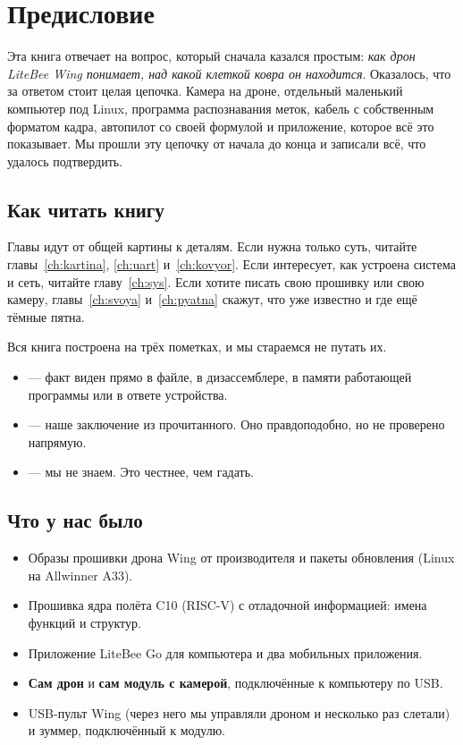 \chapter*{Предисловие}

Эта книга отвечает на вопрос, который сначала казался простым: \emph{как дрон LiteBee Wing понимает, над какой клеткой ковра он находится}. Оказалось, что за ответом стоит целая цепочка. Камера на дроне, отдельный маленький компьютер под Linux, программа распознавания меток, кабель с собственным форматом кадра, автопилот со своей формулой и приложение, которое всё это показывает. Мы прошли эту цепочку от начала до конца и записали всё, что удалось подтвердить.

\section*{Как читать книгу}

Главы идут от общей картины к деталям. Если нужна только суть, читайте главы~\ref{ch:kartina}, \ref{ch:uart} и~\ref{ch:kovyor}. Если интересует, как устроена система и сеть, читайте главу~\ref{ch:sys}. Если хотите писать свою прошивку или свою камеру, главы~\ref{ch:svoya} и~\ref{ch:pyatna} скажут, что уже известно и где ещё тёмные пятна.

\begin{zametka}
Вся книга построена на трёх пометках, и мы стараемся не путать их.
\begin{itemize}
  \item \pr{} --- факт виден прямо в файле, в дизассемблере, в памяти работающей программы или в ответе устройства.
  \item \vyv{} --- наше заключение из прочитанного. Оно правдоподобно, но не проверено напрямую.
  \item \nei{} --- мы не знаем. Это честнее, чем гадать.
\end{itemize}
\end{zametka}

\section*{Что у нас было}

\begin{itemize}
  \item Образы прошивки дрона Wing от производителя и пакеты обновления (Linux на Allwinner A33).
  \item Прошивка ядра полёта C10 (RISC-V) с отладочной информацией: имена функций и структур.
  \item Приложение LiteBee Go для компьютера и два мобильных приложения.
  \item \textbf{Сам дрон} и \textbf{сам модуль с камерой}, подключённые к компьютеру по USB.
  \item USB-пульт Wing (через него мы управляли дроном и несколько раз слетали) и зуммер, подключённый к модулю.
\end{itemize}

